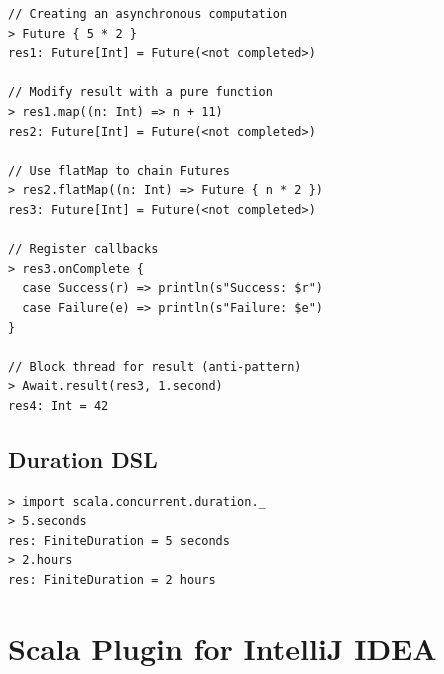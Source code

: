 \documentclass[10pt,landscape,a4paper]{article}
\begin{document}
\begin{multicols*}{4}
\begin{verbatim}
// Creating an asynchronous computation
> Future { 5 * 2 }
res1: Future[Int] = Future(<not completed>)

// Modify result with a pure function
> res1.map((n: Int) => n + 11)
res2: Future[Int] = Future(<not completed>)

// Use flatMap to chain Futures
> res2.flatMap((n: Int) => Future { n * 2 })
res3: Future[Int] = Future(<not completed>)

// Register callbacks
> res3.onComplete {
  case Success(r) => println(s"Success: $r")
  case Failure(e) => println(s"Failure: $e")
}

// Block thread for result (anti-pattern)
> Await.result(res3, 1.second)
res4: Int = 42
\end{verbatim}
  \subsection{Duration DSL}

\begin{verbatim}
> import scala.concurrent.duration._
> 5.seconds
res: FiniteDuration = 5 seconds
> 2.hours
res: FiniteDuration = 2 hours
\end{verbatim}

  \section{Scala Plugin for IntelliJ IDEA}
  {
    \setlength\tabcolsep{1mm}

}
\end{multicols*}
\end{document}

